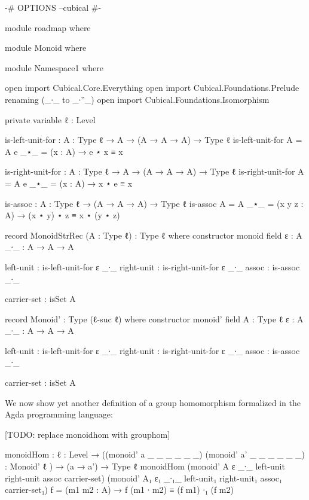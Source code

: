 \documentclass[11pt, a4paper]{article}
\begin{document}
\begin{code}[hide] {-# OPTIONS --cubical #-}

module roadmap where

\end{code}

\begin{code}[hide]

module Monoid where

module Namespace1 where

  open import Cubical.Core.Everything open import Cubical.Foundations.Prelude
renaming (_∙_ to _∙''_) open import Cubical.Foundations.Isomorphism

  private variable ℓ : Level

  is-left-unit-for : {A : Type ℓ} → A → (A → A → A) → Type ℓ is-left-unit-for {A
= A} e _⋆_ = (x : A) → e ⋆ x ≡ x

  is-right-unit-for : {A : Type ℓ} → A → (A → A → A) → Type ℓ is-right-unit-for
{A = A} e _⋆_ = (x : A) → x ⋆ e ≡ x

  is-assoc : {A : Type ℓ} → (A → A → A) → Type ℓ is-assoc {A = A} _⋆_ = (x y z :
A) → (x ⋆ y) ⋆ z ≡ x ⋆ (y ⋆ z)

  record MonoidStrRec (A : Type ℓ) : Type ℓ where constructor monoid field ε : A
_∙_ : A → A → A

      left-unit : is-left-unit-for ε _∙_ right-unit : is-right-unit-for ε _∙_
assoc : is-assoc _∙_

      carrier-set : isSet A

  record Monoid' : Type (ℓ-suc ℓ) where constructor monoid' field A : Type ℓ ε :
A _∙_ : A → A → A

      left-unit : is-left-unit-for ε _∙_ right-unit : is-right-unit-for ε _∙_
assoc : is-assoc _∙_

      carrier-set : isSet A

\end{code}

We now show yet another definition of a group homomorphism formalized in the
Agda programming language:

[TODO: replace monoidhom with grouphom]

\begin{code} monoidHom : {ℓ : Level} → ((monoid' a _ _ _ _ _ _) (monoid' a' _ _
_ _ _ _) : Monoid' {ℓ} ) → (a → a') → Type ℓ monoidHom (monoid' A ε _∙_
left-unit right-unit assoc carrier-set) (monoid' A₁ ε₁ _∙₁_ left-unit₁
right-unit₁ assoc₁ carrier-set₁) f = (m1 m2 : A) → f (m1 ∙ m2) ≡ (f m1) ∙₁ (f
m2)
\end{code}
\end{document}
